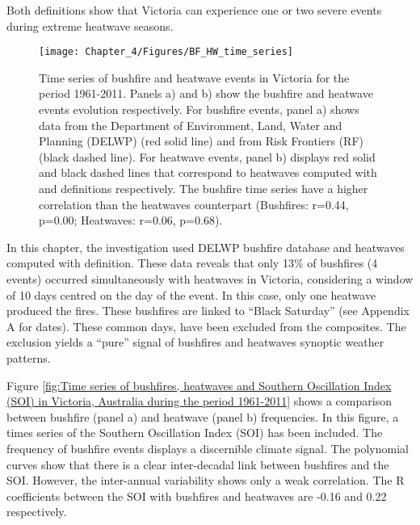 Both definitions show that Victoria
can experience one or two severe events during extreme heatwave seasons. 

\begin{figure}[h]
\noindent \begin{centering}
\texttt{[image: Chapter\_4/Figures/BF\_HW\_time\_series]}
\par\end{centering}

\caption[Time series of bushfire and heatwave events in Victoria for the period
1961-2011]{Time series of bushfire and heatwave events in Victoria for the period
1961-2011. Panels a) and b) show the bushfire and heatwave events
evolution respectively. For bushfire events, panel a) shows data from
the Department of Environment, Land, Water and Planning (DELWP) (red
solid line) and from Risk Frontiers (RF) (black dashed line). For
heatwave events, panel b) displays red solid and black dashed lines
that correspond to heatwaves computed with \citet{Nairn2009} and
\citet{Pezza2012} definitions respectively. The bushfire time series
have a higher correlation than the heatwaves counterpart (Bushfires:
r=0.44, p=0.00; Heatwaves: r=0.06, p=0.68). \label{fig:Time series of bushfire and heatwave events in Victoria for the period 1961-2011}}
\end{figure}


In this chapter, the investigation used DELWP bushfire database and
heatwaves computed with \citet{Nairn2009} definition. These data
reveals that only 13\% of bushfires (4 events) occurred simultaneously
with heatwaves in Victoria, considering a window of 10 days centred on the day of the event. 
In this case, only one heatwave produced
the fires. These bushfires are linked to ``Black Saturday'' (see
Appendix A for dates). These common days, have been excluded from
the composites. The exclusion yields a ``pure'' signal of bushfires
and heatwaves synoptic weather patterns. 

Figure \ref{fig:Time series of bushfires, heatwaves and Southern Oscillation Index (SOI) in Victoria, Australia during the period 1961-2011}
shows a comparison between bushfire (panel a) and heatwave (panel
b) frequencies. In this figure, a times series of the Southern Oscillation
Index (SOI) has been included. The frequency of bushfire events displays
a discernible climate signal. The polynomial curves show that there
is a clear inter-decadal link between bushfires and the SOI. However,
the inter-annual variability shows only a weak correlation. The R
coefficients between the SOI with bushfires and heatwaves are -0.16
and 0.22 respectively. 


